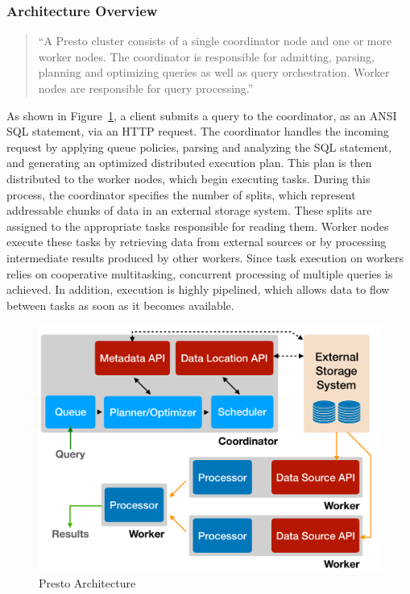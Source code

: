 \documentclass[conference]{IEEEtran}
\begin{document}
\subsubsection{Architecture Overview}

\begin{quote}
    ``A Presto cluster consists of a single coordinator node and one or more worker nodes. The coordinator is responsible for admitting, parsing, planning and optimizing queries as well as query orchestration. Worker nodes are responsible for query processing.'' \cite{b4}
\end{quote}

As shown in Figure~\ref{fig:presto-arch}, a client submits a query to the coordinator, as an ANSI SQL statement, via an HTTP request. The coordinator handles the incoming request by applying queue policies, parsing and analyzing the SQL statement, and generating an optimized distributed execution plan. This plan is then distributed to the worker nodes, which begin executing tasks. During this process, the coordinator specifies the number of splits, which represent addressable chunks of data in an external storage system. These splits are assigned to the appropriate tasks responsible for reading them. Worker nodes execute these tasks by retrieving data from external sources or by processing intermediate results produced by other workers. Since task execution on workers relies on cooperative multitasking, concurrent processing of multiple queries is achieved. In addition, execution is highly pipelined, which allows data to flow between tasks as soon as it becomes available.

\begin{figure}[htbp]
    \centering
    \includegraphics[width=\linewidth, keepaspectratio]{figures/presto-architecture.png}
    \caption{Presto Architecture \cite{b4}}
    \label{fig:presto-arch}
\end{figure}
\end{document}
